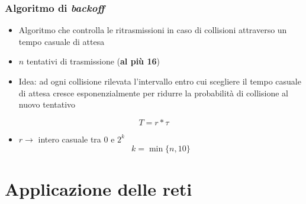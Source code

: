 \documentclass{book}
\begin{document}
\subsection{Algoritmo di \textit{backoff}}
\begin{itemize}
\item Algoritmo che controlla le ritrasmissioni in caso di collisioni
  attraverso un tempo casuale di attesa
\item $n$ tentativi di trasmissione (\textbf{al più 16})
  \item {\color{red} Idea: ad ogni collisione rilevata l’intervallo entro cui scegliere il
tempo casuale di attesa cresce esponenzialmente per ridurre la
probabilità di collisione al nuovo tentativo}
\end{itemize}
\begin{equation}
	T=r*\tau
\end{equation}
\begin{itemize}
\item $r\to$ intero casuale tra 0 e $2^k$
  \begin{equation}
	k=\min\{n,10\}
  \end{equation}
  
\end{itemize}

\chapter{Applicazione delle reti}
\printindex
\end{document}
